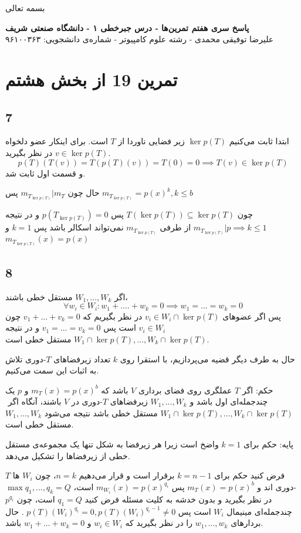 \documentclass[12pt,a4paper]{article}
\begin{document}
\begin{center}
	بسمه تعالی
\end{center}

\begin{center}
	\textbf{
		پاسخ سری هفتم تمرین‌ها
		- درس جبرخطی ۱ - دانشگاه صنعتی شریف}
	\\
	علیرضا توفیقی محمدی - رشته علوم کامپیوتر - شماره‌ی دانشجویی: ۹۶۱۰۰۳۶۳
\end{center}
\section{تمرین 19 از بخش هشتم}
\subsection{7}
ابتدا ثابت می‌کنیم
$\ker p(T)$
زیر فضایی ناوردا از $T$ است. برای اینکار عضو دلخواه $v \in \ker p(T)$ در نظر بگیرید.
$$
p(T)(T(v)) = T(p(T)(v)) = T(0) = 0 \implies T(v) \in \ker p(T)
$$
و قسمت اول ثابت شد.

حال چون 
$m_{T_{\ker p(T)}} | m_T$
پس 
$m_{T_{\ker p(T)}} = p(x)^k, k \leq b$

چون 
$T(\ker p(T)) \subseteq \ker p(T)$ 
پس
$p(T_{\ker p(T)}) = 0$
و در نتیجه
$m_{T_{\ker p(T)}} | p \implies k \leq 1$
از طرفی $m_{T_{\ker p(T)}}$ نمی‌تواند اسکالر باشد پس $k=1$ و 
$m_{T_{\ker p(T)}}(x) = p(x)$
\subsection{8}
اگر $W_1, ..., W_k$ مستقل خطی باشند،
$$\forall w_i \in W_i: w_1 + .... + w_k = 0 \implies w_1 = ... = w_k = 0$$
پس اگر عضو‌های 
$v_i \in W_i \cap \ker p(T)$
در نظر بگیریم که
$v_1 + ... + v_k = 0$
چون $v_i \in W_i$ است پس
$v_1 = ... = v_k = 0$
و در نتیجه 
$W_1 \cap \ker p(T), ..., W_k \cap \ker p(T)$
مستقل خطی است.

حال به طرف دیگر قضیه می‌پردازیم، با استقرا روی $k$ تعداد زیرفضاهای $T$-دوری تلاش به اثبات این سمت می‌کنیم.

حکم: اگر $T$ عملگری روی فضای برداری $V$ باشد که $m_T(x) = p(x)^b$ و $p$ یک چندجمله‌ای اول باشد و $W_1, ..., W_k$ زیرفضاهای $T$-دوری در $V$ باشند، آنگاه اگر ‌$W_1 \cap \ker p(T), ..., W_k \cap \ker p(T)$ مستقل خطی باشد نتیجه می‌شود $W_1, ..., W_k$ مستقل خطی است.

پایه: حکم برای $k = 1$ واضخ است زیرا هر زیرفضا به شکل تنها یک مجموعه‌ی مستقل خطی از زیرفضاها را تشکیل می‌دهد.

فرض کنید حکم برای $k = n-1$ برقرار است و قرار می‌دهیم $n=k$، چون $W_i$ ها $T$-دوری اند و $m_T(x) = p(x)^b$ پس $m_{W_i}(x) = p(x)^{q_i}$ است،
$\max{q_1, ..., q_k} = Q$
در نظر بگیرید و بدون خدشه به کلیت مسئله فرض کنید $q_1 = Q$ است، چون $p^{q_i}$ چندجمله‌ای مینیمال $W_i$ است پس 
$p(T)(W_i)^{q_i} = 0, p(T)(W_i)^{q_i-1}\neq 0$
. حال بردارهای $w_1, ..., w_k$ را در نظر بگیرید که $w_i \in W_i$ و $w_1 + ... + w_k = 0$ باشد.
\end{document}
